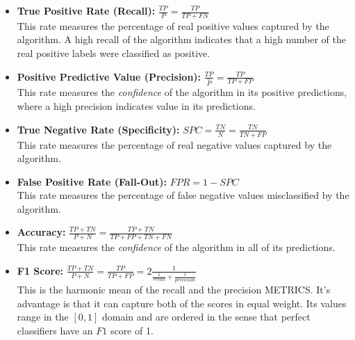 \begin{itemize}
\item \textbf{True Positive Rate  (Recall):} $\frac{TP}{P} = \frac{TP}{TP + FN}$ \\ This rate measures the percentage of real positive values captured by the algorithm. A high recall of the algorithm indicates that a high number of the real positive labels were classified as positive.


\item \textbf{Positive Predictive Value  (Precision):} $\frac{TP}{\hat{P}} = \frac{TP}{TP + FP}$ \\ This rate measures the \textit{confidence} of the algorithm in its positive predictions, where a high precision indicates value in its predictions.

\item \textbf{True Negative Rate  (Specificity):}  $ SPC = \frac{TN}{N} = \frac{TN}{TN + FP}$ \\ This rate measures the percentage of real negative values captured by the algorithm.


\item \textbf{False Positive Rate  (Fall-Out):} $FPR = 1 - SPC$ \\ This rate measures the percentage of false negative values misclassified by the algorithm.

\item \textbf{Accuracy:} $\frac{TP + TN}{P + N} = \frac{TP + TN}{TP + FP + TN + FN}$ \\ This rate measures the \textit{confidence} of the algorithm in all of its predictions.

%
\item \textbf{F1  Score:} $\frac{TP + TN}{P + N} = \frac{TP}{TP + FP} = 2 \frac{1}{  \frac{1}{recall} + \frac{1}{precision}  }$ \\ This is the harmonic mean of the recall and the precision METRICS. It's advantage is that it can capture both of the scores in equal weight. Its values range in the $[0,1 ]$ domain and are ordered in the sense that perfect classifiers have an $F1$ score of 1.

\end{itemize}


